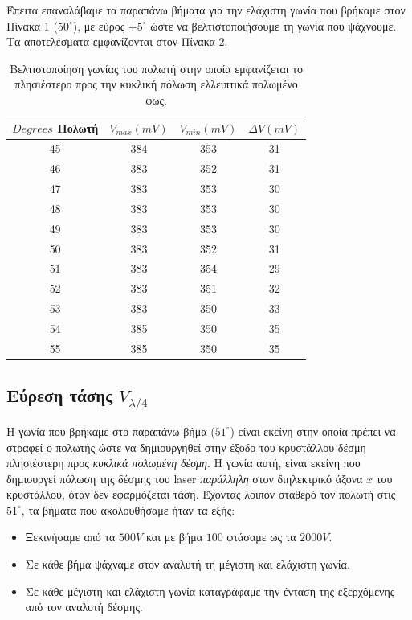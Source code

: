 \documentclass[a4paper,11pt,titlepage]{article}
\newcommand{\degrees}{^{\circ}}
\begin{document}
\newpage

Έπειτα επαναλάβαμε τα παραπάνω βήματα για την ελάχιστη γωνία που βρήκαμε στον Πίνακα 1 ($50\degrees$), με εύρος $\pm 5\degrees$ ώστε να βελτιστοποιήσουμε τη γωνία που ψάχνουμε. Τα αποτελέσματα εμφανίζονται στον Πίνακα 2.

\begin{table} [H]
\centering
\begin{tabular}{|c|c|c|c|}
\hline \rule[-2ex]{0pt}{5.5ex} $Degrees$ Πολωτή & $V_{max} (mV)$ & $V_{min} (mV)$ & $ΔV (mV)$ \\ 
\hline \rule[-2ex]{0pt}{5.5ex} 45 & 384 & 353 & 31 \\ 
\hline \rule[-2ex]{0pt}{5.5ex} 46 & 383 & 352 & 31 \\ 
\hline \rule[-2ex]{0pt}{5.5ex} 47 & 383 & 353 & 30 \\ 
\hline \rule[-2ex]{0pt}{5.5ex} 48 & 383 & 353 & 30 \\ 
\hline \rule[-2ex]{0pt}{5.5ex} 49 & 383 & 353 & 30 \\ 
\hline \rule[-2ex]{0pt}{5.5ex} 50 & 383 & 352 & 31 \\ 
\hline \rule[-2ex]{0pt}{5.5ex} 51 & 383 & 354 & 29 \\ 
\hline \rule[-2ex]{0pt}{5.5ex} 52 & 383 & 351 & 32 \\ 
\hline \rule[-2ex]{0pt}{5.5ex} 53 & 383 & 350 & 33 \\ 
\hline \rule[-2ex]{0pt}{5.5ex} 54 & 385 & 350 & 35 \\ 
\hline \rule[-2ex]{0pt}{5.5ex} 55 & 385 & 350 & 35 \\ 
\hline 
\end{tabular} 
\caption{Βελτιστοποίηση γωνίας του πολωτή στην οποία εμφανίζεται το πλησιέστερο προς την κυκλική πόλωση ελλειπτικά πολωμένο φως.}
\end{table}

\subsection{Εύρεση τάσης $V_{\lambda/4}$}

Η γωνία που βρήκαμε στο παραπάνω βήμα ($51\degrees$) είναι εκείνη στην οποία πρέπει να στραφεί ο πολωτής ώστε να δημιουργηθεί στην έξοδο του κρυστάλλου δέσμη πλησιέστερη προς \textit{κυκλικά πολωμένη δέσμη}. H γωνία αυτή, είναι εκείνη που δημιουργεί πόλωση της δέσμης του laser \textit{παράλληλη} στον διηλεκτρικό άξονα $x$ του κρυστάλλου, όταν δεν εφαρμόζεται τάση. Έχοντας λοιπόν σταθερό τον πολωτή στις $51\degrees$, τα βήματα που ακολουθήσαμε ήταν τα εξής:
\begin{itemize}
\item Ξεκινήσαμε από τα $500 V$ και με βήμα $100$ φτάσαμε ως τα $2000 V$.
\item Σε κάθε βήμα ψάχναμε στον αναλυτή τη μέγιστη και ελάχιστη γωνία.
\item Σε κάθε μέγιστη και ελάχιστη γωνία καταγράφαμε την ένταση της εξερχόμενης από τον αναλυτή δέσμης.
\end{itemize}
\end{document}
